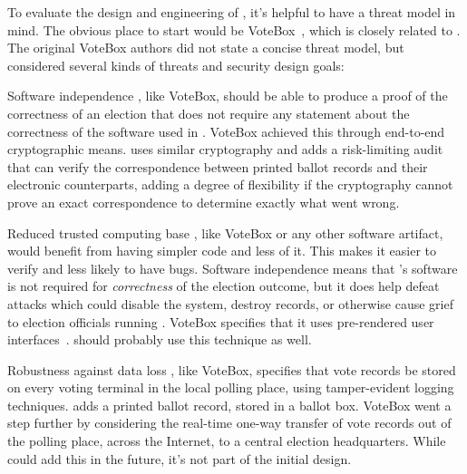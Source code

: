 \label{sec:threat}

To evaluate the design and engineering of \projname, it's helpful to
have a threat model in mind. The obvious place to start would be
VoteBox~\cite{sandler08votebox}, which is closely related to
\projname. The original VoteBox authors did not state a concise threat
model, but considered several kinds of threats and security design
goals:

\begin{compactdesc}
\item[Software independence]
    \projname, like VoteBox, should be able to produce a proof of the
    correctness of an election that does not require any statement
    about the correctness of the software used in \projname. VoteBox
    achieved this through end-to-end cryptographic means. \projname
    uses similar cryptography and adds a risk-limiting audit that can
    verify the correspondence between \projname printed ballot records
    and their electronic counterparts, adding a degree of flexibility
    if the cryptography cannot prove an exact correspondence to determine exactly what went wrong. 

\item[Reduced trusted computing base]
  \projname, like VoteBox or any other software artifact, would
  benefit from having simpler code and less of it. This makes it
  easier to verify and less likely to have bugs. Software independence
  means that \projname's software is not required for {\em
    correctness} of the election outcome, but it does help defeat
  attacks which could disable the system, destroy records, or
  otherwise cause grief to election officials running \projname.
  VoteBox specifies that it uses pre-rendered user interfaces~\cite{yee07pvote,yee06prui}.
  \projname should probably use this technique as well. 

\item[Robustness against data loss]
  \projname, like VoteBox, specifies that vote records be stored on
  every voting terminal in the local polling place, using
  tamper-evident logging techniques. \projname adds a printed
  ballot record, stored in a ballot box. VoteBox went a step further
  by considering the real-time one-way transfer of vote records out of
  the polling place, across the Internet, to a central election
  headquarters. While \projname could add this in the future, it's not part of the
  initial design.


\end{compactdesc}
